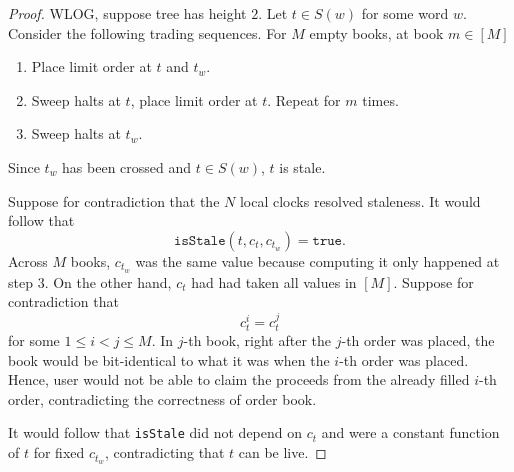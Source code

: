 \begin{proof}
    WLOG, suppose tree has height $2$. Let $t\in S(w)$ for some word $w$. Consider the following trading sequences. For $M$ empty books, at book $m\in[M]$
    \begin{enumerate}
        \item Place limit order at $t$ and $t_w$.
        \item Sweep halts at $t$, place limit order at $t$. Repeat for $m$ times.
        \item Sweep halts at $t_w$.
    \end{enumerate}
    Since $t_w$ has been crossed and $t\in S(w)$, $t$ is stale.
    
    Suppose for contradiction that the $N$ local clocks resolved staleness. It would follow that
    \begin{equation*}
        \texttt{isStale}(t,c_t,c_{t_w})=\texttt{true}.
    \end{equation*}
    Across $M$ books, $c_{t_w}$ was the same value because computing it only happened at step $3$. On the other hand, $c_t$ had had taken all values in $[M]$. Suppose for contradiction that
    \begin{equation*}
        c_t^i=c_t^j
    \end{equation*}
    for some $1\leq i<j\leq M$. In $j$-th book, right after the $j$-th order was placed, the book would be bit-identical to what it was when the $i$-th order was placed. Hence, user would not be able to claim the proceeds from the already filled $i$-th order, contradicting the correctness of order book.

    It would follow that \texttt{isStale} did not depend on $c_t$ and were a constant function of $t$ for fixed $c_{t_w}$, contradicting that $t$ can be live.
\end{proof}